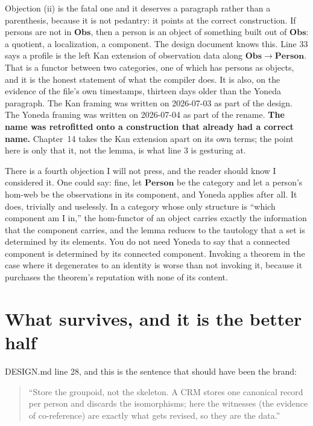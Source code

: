 Objection (ii) is the fatal one and it deserves a paragraph rather than a parenthesis, because it is not pedantry: it points at the correct construction. If persons are not in $\mathbf{Obs}$, then a person is an object of something built out of $\mathbf{Obs}$: a quotient, a localization, a component. The design document knows this. Line 33 says a profile is the left Kan extension of observation data along $\mathbf{Obs} \to \mathbf{Person}$. That is a functor between two categories, one of which has persons as objects, and it is the honest statement of what the compiler does. It is also, on the evidence of the file's own timestamps, thirteen days older than the Yoneda paragraph. The Kan framing was written on 2026-07-03 as part of the design. The Yoneda framing was written on 2026-07-04 as part of the rename. \textbf{The name was retrofitted onto a construction that already had a correct name.} Chapter~14 takes the Kan extension apart on its own terms; the point here is only that it, not the lemma, is what line 3 is gesturing at.

There is a fourth objection I will not press, and the reader should know I considered it. One could say: fine, let $\mathbf{Person}$ be the category and let a person's hom-web be the observations in its component, and Yoneda applies after all. It does, trivially and uselessly. In a category whose only structure is ``which component am I in,'' the hom-functor of an object carries exactly the information that the component carries, and the lemma reduces to the tautology that a set is determined by its elements. You do not need Yoneda to say that a connected component is determined by its connected component. Invoking a theorem in the case where it degenerates to an identity is worse than not invoking it, because it purchases the theorem's reputation with none of its content.

\section{What survives, and it is the better half}
\label{sec:groupoid}

DESIGN.md line 28, and this is the sentence that should have been the brand:

\begin{quote}
``Store the groupoid, not the skeleton. A CRM stores one canonical record per person and discards the isomorphisms; here the witnesses (the evidence of co-reference) are exactly what gets revised, so they are the data.''
\end{quote}

